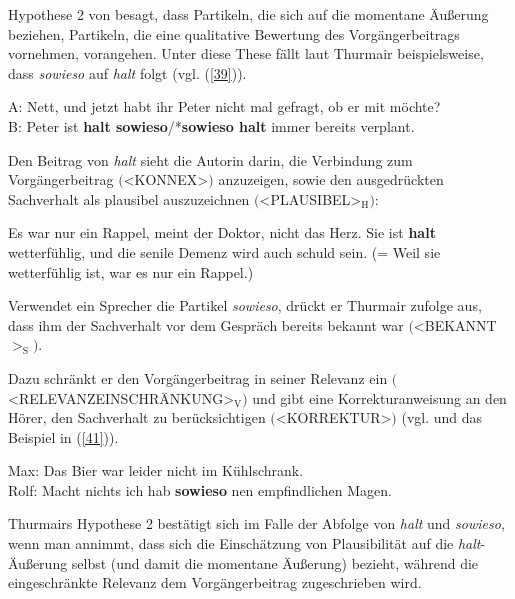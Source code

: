 Hypothese 2 von \citet{Thurmair1989} besagt, dass Partikeln, die sich auf die momentane Äußerung beziehen, Partikeln, die eine qualitative Bewertung des Vor\-gängerbeitrags vornehmen, vorangehen. Unter diese These fällt laut Thurmair beispielsweise, dass \textit{sowieso} auf \textit{halt} folgt (vgl. (\ref{39})).

\begin{exe}
	\ex\label{39} 
	A: Nett, und jetzt habt ihr Peter nicht mal gefragt, ob er mit möchte?\\
	B: Peter ist \textbf{halt sowieso}/*\textbf{sowieso halt} immer bereits verplant.
\end{exe}
Den Beitrag von\textit{ halt} sieht die Autorin darin, die Verbindung zum Vorgängerbeitrag $($<KONNEX>$)$ anzuzeigen, sowie den ausgedrückten Sachverhalt als plausibel auszuzeichnen $($<PLAUSIBEL>$_{\textrm{H}})$:

\begin{exe}
	\ex\label{40} 
			Es war nur ein Rappel, meint der Doktor, nicht das Herz. Sie ist \textbf{halt} wetterfühlig, und die senile Demenz 					wird auch schuld sein. (= Weil sie wetterfühlig ist, war es nur ein Rappel.)
			\hbox{}\hfill\hbox{\citet[125]{Thurmair1989}}	
\end{exe}
Verwendet ein Sprecher die Partikel \textit{sowieso}, drückt er Thurmair zufolge aus, dass ihm der Sachverhalt vor dem Gespräch bereits bekannt war $($<BEKANNT$>_{\textrm{S}})$. 

Dazu schränkt er den Vorgängerbeitrag in seiner Relevanz ein \linebreak $($<RELEVANZEINSCHRÄNKUNG>$_{\textrm{V}})$ und gibt eine Korrekturanweisung an den Hörer, den Sachverhalt zu berücksichtigen $($<KORREKTUR>$)$ (vgl. \citealt[136-137]{Thurmair1989} und das Beispiel in (\ref{41})).

\begin{exe}
	\ex\label{41} 
			Max: Das Bier war leider nicht im Kühlschrank.\\
			Rolf: Macht nichts ich hab \textbf{sowieso} nen empfindlichen Magen.
			\newline
			\hbox{}\hfill\hbox{\citet[138]{Thurmair1989}}	
\end{exe}
Thurmairs Hypothese 2 bestätigt sich im Falle der Abfolge von \textit{halt} und \textit{sowieso}, wenn man annimmt, dass sich die Einschätzung von Plausibilität auf die \textit{halt}-Äußerung selbst (und damit die momentane Äußerung) bezieht, während die eingeschränkte Relevanz dem Vorgängerbeitrag zugeschrieben wird.

